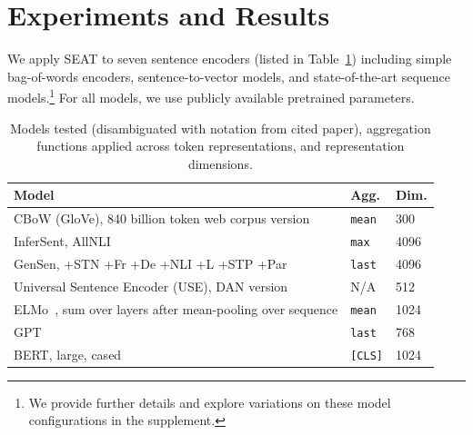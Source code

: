 \documentclass[11pt,a4paper]{article}
\begin{document}
\section{Experiments and Results}

We apply SEAT to seven sentence encoders (listed in Table~\ref{tab:models}) including simple bag-of-words encoders, sentence-to-vector models, and state-of-the-art sequence models.\footnote{
    We provide further details and explore variations on these model configurations in the supplement.
}
For all models, we use publicly available pretrained parameters.

\begin{table}[t]
\small
\centering
 \renewcommand{\arraystretch}{1.25}
\begin{tabular}{p{.66\linewidth} p{.08\linewidth} p{.08\linewidth}}
    \toprule
    \textbf{Model} & \textbf{Agg.} & \textbf{Dim.} \\\midrule
    CBoW (GloVe), 840 billion token web corpus version~\cite{pennington2014glove} & \texttt{mean} & 300 \\ 
    InferSent, AllNLI~\cite{conneau2017supervised} & \texttt{max} & 4096 \\
    GenSen, +STN +Fr +De +NLI +L +STP +Par~\cite{subramanian2018learning} & \texttt{last} & 4096 \\ 
    Universal Sentence Encoder (USE), DAN version \citep{cer2018universal} & N/A & 512 \\
    ELMo~\cite{peters2018deep}, sum over layers after mean-pooling over sequence & \texttt{mean} & 1024 \\
    GPT~\cite{radford2018improving} & \texttt{last} & 768 \\ 
    BERT, large, cased~\cite{devlin2018bert} & \texttt{[CLS]} & 1024 \\
    \bottomrule
\end{tabular}
\caption{Models tested (disambiguated with notation from cited paper), aggregation functions applied across token representations, and representation dimensions.}
\label{tab:models}
\end{table}
\end{document}
